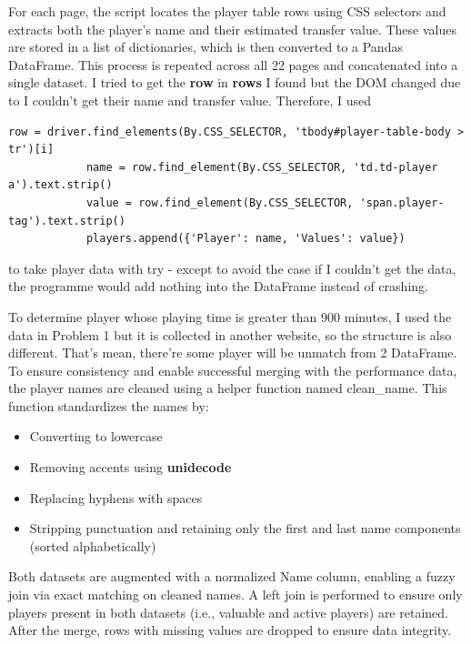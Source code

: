 \documentclass[a4paper,12pt]{article}
\begin{document}
\begin{itemize}[label= {*}, leftmargin= 1cm]
\begin{itemize}[label= {}, leftmargin= 1cm]
        For each page, the script locates the player table rows using CSS selectors and extracts both the player's name and their estimated transfer value. These values are stored in a list of dictionaries, which is then converted to a Pandas DataFrame. This process is repeated across all 22 pages and concatenated into a single dataset. I tried to get the \textbf{row} in \textbf{rows} I found but the DOM changed due to I couldn't get their name and transfer value. Therefore, I used 
        \vspace{0.3cm}

        \begin{Verbatim}[fontsize=\footnotesize, xleftmargin= -2cm]
            row = driver.find_elements(By.CSS_SELECTOR, 'tbody#player-table-body > tr')[i]
            name = row.find_element(By.CSS_SELECTOR, 'td.td-player a').text.strip()
            value = row.find_element(By.CSS_SELECTOR, 'span.player-tag').text.strip()
            players.append({'Player': name, 'Values': value})
        \end{Verbatim}
        \vspace{0.3cm}
        
        to take player data with try - except to avoid the case if I couldn't get the data, the programme would add nothing into the DataFrame instead of crashing.
        \vspace{0.3cm}

        To determine player whose playing time is greater than 900 minutes, I used the data in Problem 1 but it is collected in another website, so the structure is also different. That's mean, there're some player will be unmatch from 2 DataFrame. To ensure consistency and enable successful merging with the performance data, the player names are cleaned using a helper function named clean\_name. This function standardizes the names by:
        \begin{itemize}[label= {+}, leftmargin= 1cm]
            \item Converting to lowercase
            \item Removing accents using \textbf{unidecode}
            \item Replacing hyphens with spaces
            \item Stripping punctuation and retaining only the first and last name components (sorted alphabetically)
        \end{itemize}
        \vspace{0.3cm}

        Both datasets are augmented with a normalized Name column, enabling a fuzzy join via exact matching on cleaned names. A left join is performed to ensure only players present in both datasets (i.e., valuable and active players) are retained. After the merge, rows with missing values are dropped to ensure data integrity.


\end{itemize}
\end{itemize}
\end{document}
